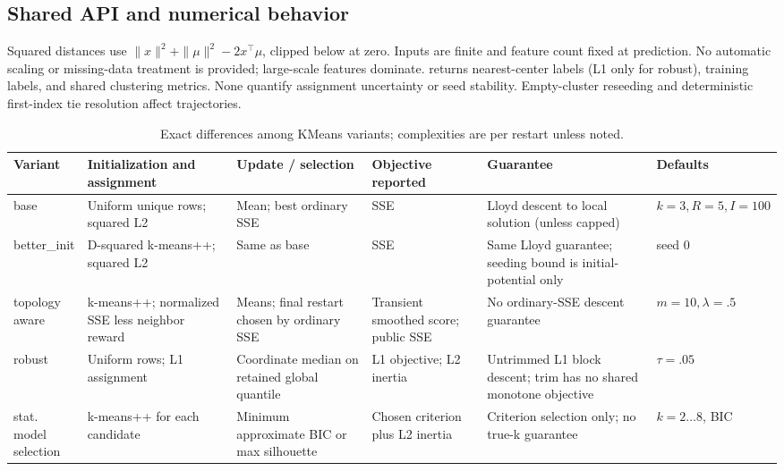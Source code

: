\documentclass[conference]{IEEEtran}
\begin{document}
\subsection{Shared API and numerical behavior}
Squared distances use \(\|x\|^2+\|\mu\|^2-2x^\top\mu\), clipped below at zero. Inputs are finite and feature count fixed at prediction. No automatic scaling or missing-data treatment is provided; large-scale features dominate.  returns nearest-center labels (L1 only for robust),  training labels, and  shared clustering metrics. None quantify assignment uncertainty or seed stability. Empty-cluster reseeding and deterministic first-index tie resolution affect trajectories.
\begin{table}[t]\caption{Exact differences among KMeans variants; complexities are per restart unless noted.}\label{tab:variants}\centering\scriptsize
\begin{tabular}{p{1.45cm}p{2.4cm}p{2.4cm}p{2.5cm}p{2.5cm}p{1.5cm}}\toprule
Variant & Initialization and assignment & Update / selection & Objective reported & Guarantee & Defaults\\\midrule
base & Uniform unique rows; squared L2 & Mean; best ordinary SSE & SSE & Lloyd descent to local solution (unless capped) & \(k=3,R=5,I=100\)\\
better\_init & D-squared k-means++; squared L2 & Same as base & SSE & Same Lloyd guarantee; seeding bound is initial-potential only & seed 0\\
\shortstack{topology\\aware} & k-means++; normalized SSE less neighbor reward & Means; final restart chosen by ordinary SSE & Transient smoothed score; public SSE & No ordinary-SSE descent guarantee & \(m=10,\lambda=.5\)\\
robust & Uniform rows; L1 assignment & Coordinate median on retained global quantile & L1 objective; L2 inertia & Untrimmed L1 block descent; trim has no shared monotone objective & \(\tau=.05\)\\
\shortstack{stat. model\\selection} & k-means++ for each candidate & Minimum approximate BIC or max silhouette & Chosen criterion plus L2 inertia & Criterion selection only; no true-k guarantee & \(k=2\ldots8\), BIC\\\bottomrule
\end{tabular}\end{table}
\end{document}
